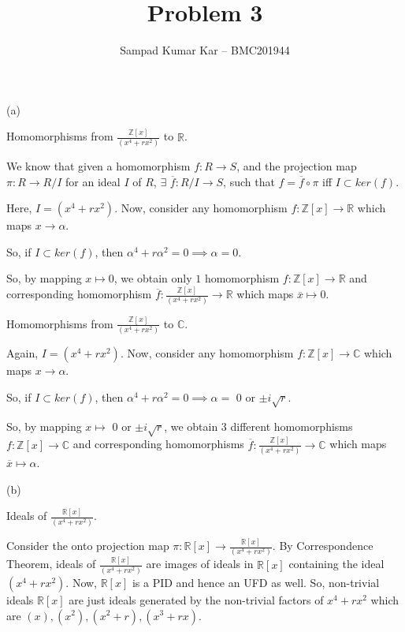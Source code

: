 \documentclass[12pt,a4paper]{article}
\title{Problem 3}
\author{Sampad Kumar Kar -- BMC201944}
\theoremstyle{definition}
\begin{document}
\maketitle

\begin{flushleft}

(a)
\medskip

Homomorphisms from $\frac{\mathbb{Z}[x]}{(x^4 + rx^2)}$ to $\mathbb{R}$.

\medskip

We know that given a homomorphism $f:R \to S$, and the projection map $\pi:R \to R/I$ for an ideal $I$ of $R$, $\exists$ $\overline{f}:R/I \to S$, such that $f = \overline{f}\circ\pi$ iff $I \subset ker(f)$.

\medskip

Here, $I = (x^4 + rx^2)$. Now, consider any homomorphism $f:\mathbb{Z}[x] \to \mathbb{R}$ which maps $x \to \alpha$.

So, if $I \subset ker(f)$, then $\alpha^4 + r\alpha^2 = 0 \implies \alpha = 0$.

\medskip

So, by mapping $x \mapsto 0$, we obtain only $1$ homomorphism $f:\mathbb{Z}[x] \to \mathbb{R}$ and corresponding homomorphism $\overline{f}:\frac{\mathbb{Z}[x]}{(x^4 + rx^2)} \to \mathbb{R}$ which maps $\overline{x} \mapsto 0$.

\bigskip

Homomorphisms from $\frac{\mathbb{Z}[x]}{(x^4 + rx^2)}$ to $\mathbb{C}$.

\medskip

Again, $I = (x^4 + rx^2)$. Now, consider any homomorphism $f:\mathbb{Z}[x] \to \mathbb{C}$ which maps $x \to \alpha$.

So, if $I \subset ker(f)$, then $\alpha^4 + r\alpha^2 = 0 \implies \alpha = $ $0$ or $\pm i\sqrt{r}$.

\medskip

So, by mapping $x \mapsto$ $0$ or $\pm i\sqrt{r}$, we obtain $3$ different homomorphisms $f:\mathbb{Z}[x] \to \mathbb{C}$ and corresponding homomorphisms $\overline{f}:\frac{\mathbb{Z}[x]}{(x^4 + rx^2)} \to \mathbb{C}$ which maps $\overline{x} \mapsto \alpha$.

\bigskip
\bigskip

(b)
\medskip

Ideals of $\frac{\mathbb{R}[x]}{(x^4 + rx^2)}$.

\medskip

Consider the onto projection map $\pi:\mathbb{R}[x] \to \frac{\mathbb{R}[x]}{(x^4 + rx^2)}$. By Correspondence Theorem, ideals of $\frac{\mathbb{R}[x]}{(x^4 + rx^2)}$ are images of ideals in $\mathbb{R}[x]$ containing the ideal $(x^4 + rx^2)$. Now, $\mathbb{R}[x]$ is a PID and hence an UFD as well. So, non-trivial ideals $\mathbb{R}[x]$ are just ideals generated by the non-trivial factors of $x^4 + rx^2$ which are $(x), (x^2), (x^2 +r), (x^3 + rx)$.


\end{flushleft}
\end{document}
